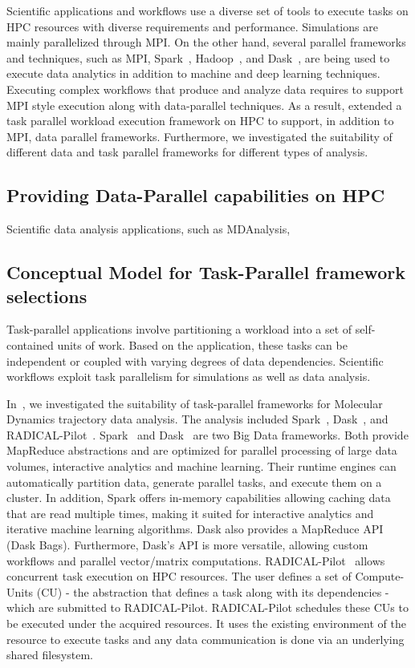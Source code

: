 \label{prior_work}
Scientific applications and workflows use a diverse set of tools to execute tasks on HPC resources with diverse requirements and performance.
Simulations are mainly parallelized through MPI.
On the other hand, several parallel frameworks and techniques, such as MPI, Spark~\cite{zaharia2010spark}, Hadoop~\cite{hadoop}, and Dask~\cite{rocklin2015dask}, are being used to execute data analytics in addition to machine and deep learning techniques.
Executing complex workflows that produce and analyze data requires to support MPI style execution along with data-parallel techniques.
As a result, extended a task parallel workload execution framework on HPC to support, in addition to MPI, data parallel frameworks.
Furthermore, we investigated the suitability of different data and task parallel frameworks for different types of analysis.

\subsection{Providing Data-Parallel capabilities on HPC}
Scientific data analysis applications, such as MDAnalysis,


\subsection{Conceptual Model for Task-Parallel framework selections}
Task-parallel applications involve partitioning a workload into a set of self-
contained units of work. Based on the application, these tasks can be 
independent or coupled with varying degrees of data dependencies. Scientific 
workflows exploit task parallelism for simulations as well as data analysis.

In~\cite{paraskevakos2018task}, we investigated the suitability of task-parallel 
frameworks for Molecular Dynamics trajectory data analysis. The analysis 
included Spark~\cite{zaharia2010spark}, Dask~\cite{rocklin2015dask}, and 
RADICAL-Pilot~\cite{merzky2019using}. Spark~\cite{zaharia2010spark} and 
Dask~\cite{rocklin2015dask} are two Big Data frameworks. Both provide MapReduce 
abstractions and are optimized for parallel processing of large data volumes, 
interactive analytics and machine learning. Their runtime engines can 
automatically partition data, generate parallel tasks, and execute them on a 
cluster. In addition, Spark offers in-memory capabilities allowing caching data 
that are read multiple times, making it suited for interactive analytics and 
iterative machine learning algorithms. Dask also provides a MapReduce API 
(Dask Bags). Furthermore, Dask’s API is more versatile, allowing custom 
workflows and parallel vector/matrix computations. 
RADICAL-Pilot~\cite{merzky2019using} allows concurrent task execution on HPC 
resources. The user defines a set of Compute-Units (CU) - the abstraction that 
defines a task along with its dependencies - which are submitted to 
RADICAL-Pilot. RADICAL-Pilot schedules these CUs to be executed under the 
acquired resources. It uses the existing environment of the resource to execute 
tasks and any data communication is done via an underlying shared filesystem.

